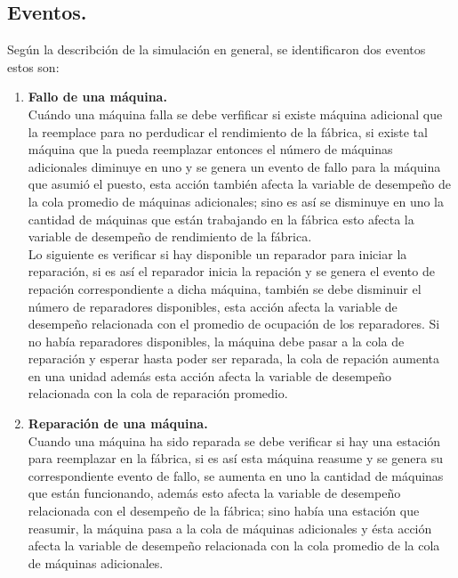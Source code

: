 \documentclass[12pt]{article}
\begin{document}
\newpage 


\subsection{Eventos.}

Según la describción de la simulaci\'on en general, se identificaron dos eventos estos son:

\begin{enumerate}
\item \textbf{Fallo de una máquina.}\\
Cuándo una máquina falla se debe verfificar si existe máquina adicional que la reemplace para no perdudicar el rendimiento de la fábrica, si existe tal máquina que la pueda reemplazar entonces el número de m\'aquinas adicionales diminuye en uno y se genera un evento de fallo para la m\'aquina que asumi\'o el puesto, esta acci\'on tambi\'en afecta la variable de desempeño de la cola promedio de m\'aquinas adicionales; sino es as\'i se disminuye en uno la cantidad de m\'aquinas que est\'an trabajando en la f\'abrica esto afecta la variable de desempeño de rendimiento de la f\'abrica. \\

Lo siguiente es verificar si hay disponible un reparador para iniciar la reparaci\'on, si es as\'i el reparador inicia la repaci\'on y se genera el evento de repaci\'on correspondiente a dicha m\'aquina, tambi\'en se debe disminuir el n\'umero de reparadores disponibles, esta acción afecta la variable de desempeño relacionada con el promedio de ocupación de los reparadores. Si no hab\'ia reparadores disponibles, la m\'aquina debe pasar a la cola de reparaci\'on y esperar hasta poder ser reparada, la cola de repaci\'on aumenta en una unidad adem\'as esta acci\'on afecta la variable de desempeño relacionada con la cola de reparaci\'on promedio.


\item \textbf{Reparación de una máquina.}\\

Cuando una m\'aquina ha sido reparada se debe verificar si hay una estaci\'on para reemplazar en la f\'abrica, si es as\'i esta m\'aquina reasume y se genera su correspondiente evento de fallo, se aumenta en uno la cantidad de máquinas que están funcionando, además esto afecta la variable de desempeño relacionada con el desempeño de la fábrica; sino había una estación que reasumir, la máquina pasa a la cola de máquinas adicionales y ésta acción afecta la variable de desempeño relacionada con la cola promedio de la cola de máquinas adicionales.\\


\end{enumerate}
\end{document}

